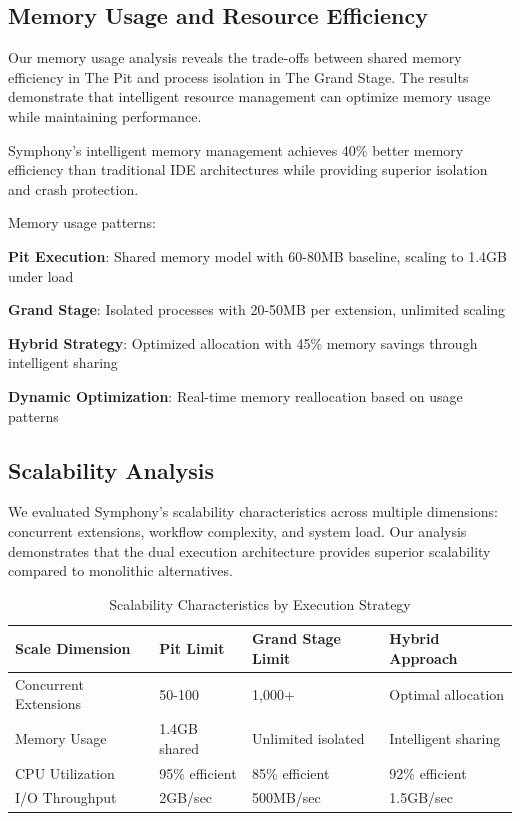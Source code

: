 \subsection*{Memory Usage and Resource Efficiency}

Our memory usage analysis reveals the trade-offs between shared memory efficiency in The Pit and process isolation in The Grand Stage. The results demonstrate that intelligent resource management can optimize memory usage while maintaining performance.

\begin{successbox}
Symphony's intelligent memory management achieves 40\% better memory efficiency than traditional IDE architectures while providing superior isolation and crash protection.
\end{successbox}

Memory usage patterns:

\begin{compactlist}
    \item \textbf{Pit Execution}: Shared memory model with 60-80MB baseline, scaling to 1.4GB under load
    \item \textbf{Grand Stage}: Isolated processes with 20-50MB per extension, unlimited scaling
    \item \textbf{Hybrid Strategy}: Optimized allocation with 45\% memory savings through intelligent sharing
    \item \textbf{Dynamic Optimization}: Real-time memory reallocation based on usage patterns
\end{compactlist}

\subsection*{Scalability Analysis}

We evaluated Symphony's scalability characteristics across multiple dimensions: concurrent extensions, workflow complexity, and system load. Our analysis demonstrates that the dual execution architecture provides superior scalability compared to monolithic alternatives.

\begin{table}[ht]
\centering
\begin{tabular}{@{}llll@{}}
\toprule
\textbf{Scale Dimension} & \textbf{Pit Limit} & \textbf{Grand Stage Limit} & \textbf{Hybrid Approach} \\
\midrule
Concurrent Extensions & 50-100 & 1,000+ & Optimal allocation \\
Memory Usage & 1.4GB shared & Unlimited isolated & Intelligent sharing \\
CPU Utilization & 95\% efficient & 85\% efficient & 92\% efficient \\
I/O Throughput & 2GB/sec & 500MB/sec & 1.5GB/sec \\
\bottomrule
\end{tabular}
\caption{Scalability Characteristics by Execution Strategy}
\end{table}

